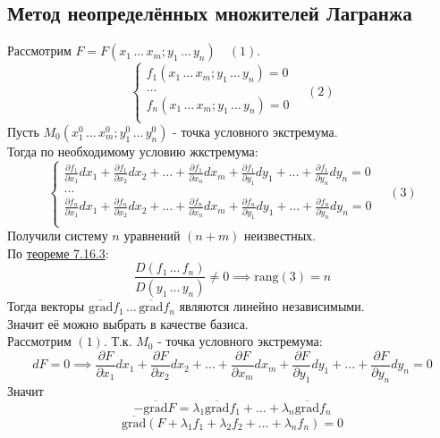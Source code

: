 \documentclass[12pt]{article}
\begin{document}
    \subsection{Метод неопределённых множителей Лагранжа}\noindent
    Рассмотрим $F = F(x_1\, \dots\, x_m; y_1\, \dots\, y_n) \quad (1)$.
    \[ \begin{cases}
        f_1(x_1\, \dots\, x_m; y_1\, \dots\, y_n) = 0\\
        \dots\\
        f_n(x_1\, \dots\, x_m; y_1\, \dots\, y_n) = 0\\
    \end{cases} \quad (2) \]
    Пусть $M_0 (x^0_1\, \dots\, x^0_m; y^0_1\, \dots\, y^0_n)$ - точка условного экстремума.\\
    Тогда по необходимому условию жкстремума:
    \[ 
        \begin{cases}
            \frac{\partial f_1}{\partial x_1}dx_1 + \frac{\partial f_1}{\partial x_2}dx_2 + \dots + \frac{\partial f_1}{\partial x_n}dx_m + \frac{\partial f_1}{\partial y_1}dy_1 + \dots + \frac{\partial f_1}{\partial y_n}dy_n = 0\\
            \dots\\
            \frac{\partial f_n}{\partial x_1}dx_1 + \frac{\partial f_n}{\partial x_2}dx_2 + \dots + \frac{\partial f_n}{\partial x_n}dx_m + \frac{\partial f_n}{\partial y_1}dy_1 + \dots + \frac{\partial f_n}{\partial y_n}dy_n = 0\\
        \end{cases} \quad (3)
    \]
    Получили систему $n$ уравнений $(n + m)$ неизвестных.\\
    По \hyperref[th:7.16.3]{теореме 7.16.3}:
    \[ \frac{D(f_1\, \dots\, f_n)}{D(y_1\, \dots\, y_n)} \ne 0 \implies \text{rang}(3) = n \]
    Тогда векторы $\overline{\text{grad}}f_1\, \dots\, \overline{\text{grad}}f_n$ являются линейно независимыми.\\
    Значит её можно выбрать в качестве базиса.\\
    Рассмотрим $(1)$. Т.к. $M_0$ - точка условного экстремума:
    \[ dF = 0 \implies \frac{\partial F}{\partial x_1}dx_1 + \frac{\partial F}{\partial x_2}dx_2 + \dots + \frac{\partial F}{\partial x_m}dx_m + \frac{\partial F}{\partial y_1}dy_1 + \dots + \frac{\partial F}{\partial y_n}dy_n = 0 \]
    Значит 
    \[ -\overline{\text{grad}}F = \lambda_1 \overline{\text{grad}}f_1 + \dots + \lambda_n \overline{\text{grad}}f_n \]
    \[ \overline{\text{grad}}(F + \lambda_1 f_1 + \lambda_2 f_2 + \dots + \lambda_n f_n) = 0 \]
\end{document}
